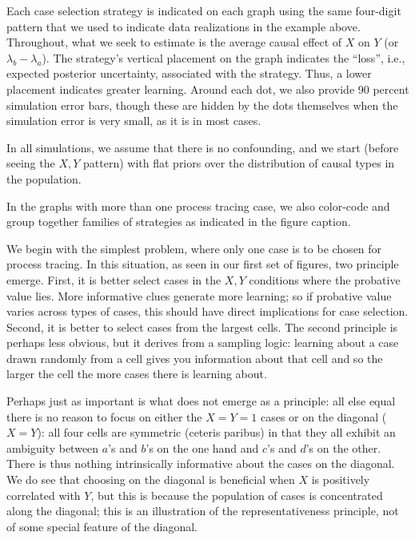 \documentclass[12pt,]{book}
\begin{document}
Each case selection strategy is indicated on each graph using the same four-digit pattern that we used to indicate data realizations in the example above. Throughout, what we seek to estimate is the average causal effect of \(X\) on \(Y\) (or \(\lambda_b-\lambda_a\)). The strategy's vertical placement on the graph indicates the ``loss'', i.e., expected posterior uncertainty, associated with the strategy. Thus, a lower placement indicates greater learning. Around each dot, we also provide 90 percent simulation error bars, though these are hidden by the dots themselves when the simulation error is very small, as it is in most cases.

In all simulations, we assume that there is no confounding, and we start (before seeing the \(X, Y\) pattern) with flat priors over the distribution of causal types in the population.

In the graphs with more than one process tracing case, we also color-code and group together families of strategies as indicated in the figure caption.

We begin with the simplest problem, where only one case is to be chosen for process tracing. In this situation, as seen in our first set of figures, two principle emerge. First, it is better select cases in the \(X,Y\) conditions where the probative value lies. More informative clues generate more learning; so if probative value varies across types of cases, this should have direct implications for case selection. Second, it is better to select cases from the largest cells. The second principle is perhaps less obvious, but it derives from a sampling logic: learning about a case drawn randomly from a cell gives you information about that cell and so the larger the cell the more cases there is learning about.

Perhaps just as important is what does not emerge as a principle: all else equal there is no reason to focus on either the \(X=Y=1\) cases or on the diagonal (\(X=Y\)): all four cells are symmetric (ceteris paribus) in that they all exhibit an ambiguity between \(a\)'s and \(b\)'s on the one hand and \(c\)'s and \(d\)'s on the other. There is thus nothing intrinsically informative about the cases on the diagonal. We do see that choosing on the diagonal is beneficial when \(X\) is positively correlated with \(Y\), but this is because the population of cases is concentrated along the diagonal; this is an illustration of the representativeness principle, not of some special feature of the diagonal.
\end{document}
